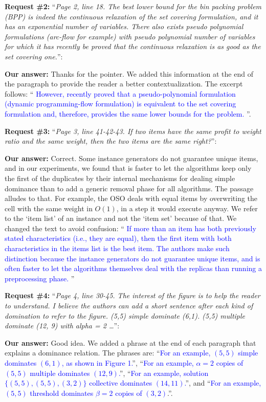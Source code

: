 \documentclass{elsarticle}
\begin{document}
\textbf{Request \#2:} ``\textit{Page 2, line 18. The best lower bound for the bin packing problem (BPP) is indeed the continuous relaxation of the set covering formulation, and it has an exponential number of variables. There also exists pseudo polynomial formulations (arc-flow for example) with pseudo polynomial number of variables for which it has recently be proved that the continuous relaxation is as good as the set covering one.}'':

\textbf{Our answer:} Thanks for the pointer. We added this information at the end of the paragraph to provide the reader a better contextualization. The excerpt follows: ``\textcolor{blue}{
However, recently \cite{eq_lb_delorme} proved that a pseudo-polynomial formulation (dynamic programming-flow formulation) is equivalent to the set covering formulation and, therefore, provides the same lower bounds for the problem.
}''.
\medskip

\textbf{Request \#3:} ``\textit{Page 3, line 41-42-43. If two items have the same profit to weight ratio and the same weight, then the two items are the same right?}'':

\textbf{Our answer:}
Correct.
Some instance generators do not guarantee unique items, and in our experiments, we found that is faster to let the algorithms keep only the first of the duplicates by their internal mechanisms for dealing simple dominance than to add a generic removal phase for all algorithms.
The passage alludes to that.
For example, the OSO deals with equal items by overwriting the cell with the same weight in \(O(1)\), in a step it would execute anyway.
We refer to the `item list' of an instance and not the `item set' because of that.
We changed the text to avoid confusion: ``\textcolor{blue}{
If more than an item has both previously stated characteristics (i.e., they are equal), then the first item with both characteristics in the items list is the best item.
The authors make such distinction because the instance generators do not guarantee unique items, and is often faster to let the algorithms themselves deal with the replicas than running a preprocessing phase.
}''
\medskip

\textbf{Request \#4:} ``\textit{Page 4, line 30-45. The interest of the figure is to help the reader to understand. I believe the authors can add a short sentence after each kind of domination to refer to the figure. (5,5) simple dominate (6,1). (5,5) multiple dominate (12, 9) with alpha = 2 \dots}'':

\textbf{Our answer:} Good idea. We added a phrase at the end of each paragraph that explains a dominance relation. The phrases are: ``\textcolor{blue}{For an example, \((5, 5)\) simple dominates \((6, 1)\), as shown in Figure 1.}'', ``\textcolor{blue}{For an example, \(\alpha = 2\) copies of \((5, 5)\) multiple dominates \((12, 9)\).}'', ``\textcolor{blue}{For an example, solution \(\{(5, 5), (5, 5), (3, 2)\}\) collective dominates \((14, 11)\).}'', and ``\textcolor{blue}{For an example, \((5, 5)\) threshold dominates \(\beta = 2\) copies of \((3, 2)\)}.''.
\medskip
\end{document}
